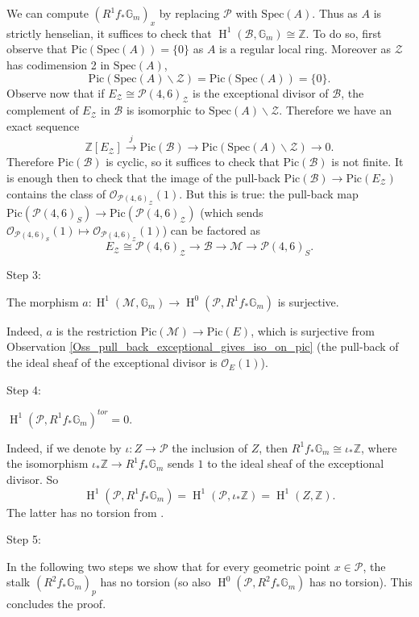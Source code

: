 \documentclass[11pt]{amsart}
\theoremstyle{definition}
\theoremstyle{remark}
\newcounter{step}
\newcommand{\calO}{\mathcal O}
\newcommand{\calM}{\mathcal M}
\newcommand{\calB}{\mathcal B}
\newcommand{\calP}{\mathcal P}
\newcommand{\calZ}{\mathcal Z}
\newcommand{\bG}{\mathbb{G}}
\newcommand{\Spec}{\mathrm{Spec}}
\newcommand{\Pic}{\mathrm{Pic}}
\newcommand{\oH}{\operatorname{H}}
\begin{document}
 We can compute  $(R^1f_*\bG_m)_x$ by replacing $\calP$ with $\Spec(A)$. Thus as $A$ is strictly henselian, it suffices to check that $\oH^1(\calB,\bG_m)\cong \mathbb{Z}$. To do so, first observe that $\Pic(\Spec(A))=\{0\}$ as $A$ is a regular local ring. Moreover as $\calZ$ has codimension 2 in $\Spec(A)$, $$\Pic(\Spec(A)\smallsetminus \calZ) = \Pic(\Spec(A)) = \{0\}.$$
Observe now that if $E_{\calZ}\cong \calP(4,6)_{\calZ}$ is the exceptional divisor of $\calB$, the complement of $E_{\calZ}$ in $\calB$ is isomorphic to $\Spec(A)\smallsetminus {\calZ}$. Therefore we have an exact sequence
$$\mathbb{Z}[E_{\calZ}]\xrightarrow{j} \Pic(\calB)\to \Pic(\Spec(A)\smallsetminus {\calZ})\to 0.$$
Therefore $\Pic(\calB)$ is cyclic, so it suffices to check that $\Pic(\calB)$ is not finite. It is enough then to check that the image of the pull-back $\Pic(\calB)\to \Pic(E_{\calZ})$ contains the class of $\calO_{\calP(4,6)_{\calZ}}(1)$.
But this is true: the pull-back map $\Pic(\calP(4,6)_S)\to \Pic(\calP(4,6)_{\calZ})$ (which sends $\calO_{\calP(4,6)_S}(1)\mapsto \calO_{\calP(4,6)_{\calZ}}(1)$) can be factored as 
$$E_{\calZ}\cong \calP(4,6)_{\calZ}\to \calB\to \calM\to \calP(4,6)_S.$$



\begin{bf}
Step 3:
\end{bf} The morphism $a:\oH^1(\calM,\bG_m) \to \oH^0(\calP,R^1f_*\bG_m)$ is surjective.

Indeed, $a$ is the restriction $\Pic(\calM)\to \Pic(E)$, which is surjective from Observation \ref{Oss_pull_back_exceptional_gives_iso_on_pic} (the pull-back of the ideal sheaf of the exceptional divisor is $\calO_E(1)$).

\begin{bf} Step 4:\end{bf} $\oH^1(\calP, R^1f_*\bG_m)^{tor} = 0$.

Indeed, if we denote by $\iota:Z\to \calP$ the inclusion of $Z$, then $R^1f_*\bG_m \cong \iota_*\mathbb{Z}$, where the isomorphism $\iota_*\mathbb{Z}\to R^1f_*\bG_m$ sends $1$ to the ideal sheaf of the exceptional divisor. So $$\oH^1(\calP, R^1f_*\bG_m) = \oH^1(\calP, \iota_*\mathbb{Z}) = \oH^1(Z, \mathbb{Z}).$$
The latter has no torsion from \cite[Corollary 7.9.1]{Wei91}.



\begin{bf}
Step 5:
\end{bf}
In the following two steps we show that for every geometric point $x\in \calP$, the stalk $(R^2f_*\bG_m)_p$ has no torsion (so also $\oH^0(\calP,R^2f_*\bG_m)$ has no torsion). This concludes the proof.
\end{document}
